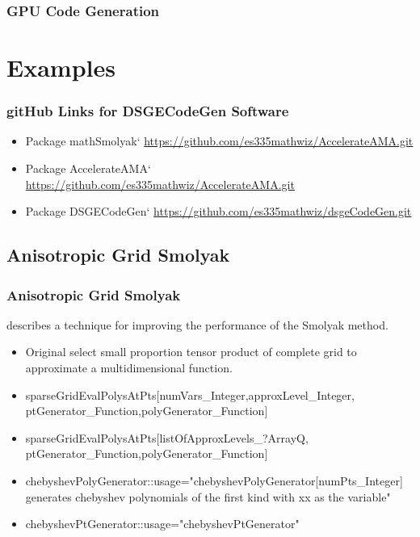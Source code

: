 \documentclass{beamer}
\begin{document}
\begin{frame}
  \frametitle{GPU Code Generation}
  
\end{frame}


\section{Examples}


\begin{frame}
  \frametitle{gitHub Links for DSGECodeGen Software}
  

  \begin{itemize}
  \item Package mathSmolyak` \href{https://github.com/es335mathwiz/AccelerateAMA.git}{https://github.com/es335mathwiz/AccelerateAMA.git}
  \item Package AccelerateAMA` \href{https://github.com/es335mathwiz/AccelerateAMA.git}{https://github.com/es335mathwiz/AccelerateAMA.git}
  \item Package DSGECodeGen` \href{https://github.com/es335mathwiz/dsgeCodeGen.git}{https://github.com/es335mathwiz/dsgeCodeGen.git}
\end{itemize}

\end{frame}



\subsection{Anisotropic Grid Smolyak}


\begin{frame}
  \frametitle{Anisotropic Grid Smolyak}
{\small
\cite{Judd2013} describes a technique for improving the performance of
the Smolyak method.
\begin{itemize}
\item Original select small proportion tensor product of complete grid to 
approximate a multidimensional function.
\item sparseGridEvalPolysAtPts[numVars\_Integer,approxLevel\_Integer,
ptGenerator\_Function,polyGenerator\_Function] 
\item sparseGridEvalPolysAtPts[listOfApproxLevels\_?ArrayQ,
ptGenerator\_Function,polyGenerator\_Function] 
\item chebyshevPolyGenerator::usage="chebyshevPolyGenerator[numPts\_Integer] generates chebyshev polynomials of the first kind with xx as the variable"
\item chebyshevPtGenerator::usage="chebyshevPtGenerator"
\end{itemize}
}
\end{frame}
\end{document}
